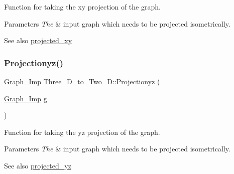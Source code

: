 Function for taking the xy projection of the graph. 


\begin{DoxyParams}{Parameters}
{\em The} & input graph which needs to be projected isometrically. \\
\hline
\end{DoxyParams}
\begin{DoxySeeAlso}{See also}
\mbox{\hyperlink{class_three___d__to___two___d_a4c2a10bbaa546ce8fb6ea1ecc2e51ea8}{projected\+\_\+xy}} 
\end{DoxySeeAlso}
\mbox{\label{class_three___d__to___two___d_a88bc95eea0f7a0cb4c4a97b7aead1d6d}} 
\subsubsection{\texorpdfstring{Projectionyz()}{Projectionyz()}}
{\footnotesize\ttfamily \mbox{\hyperlink{class_graph___imp}{Graph\+\_\+\+Imp}} Three\+\_\+\+D\+\_\+to\+\_\+\+Two\+\_\+\+D\+::\+Projectionyz (\begin{DoxyParamCaption}\item[{\mbox{\hyperlink{class_graph___imp}{Graph\+\_\+\+Imp}}}]{g }\end{DoxyParamCaption})}



Function for taking the yz projection of the graph. 


\begin{DoxyParams}{Parameters}
{\em The} & input graph which needs to be projected isometrically. \\
\hline
\end{DoxyParams}
\begin{DoxySeeAlso}{See also}
\mbox{\hyperlink{class_three___d__to___two___d_a9f4acfdc86df27c3e0772884cd71bcba}{projected\+\_\+yz}} 
\end{DoxySeeAlso}
\mbox{\label{class_three___d__to___two___d_ac45147c0fe25318b89d14114b6956834}} 
